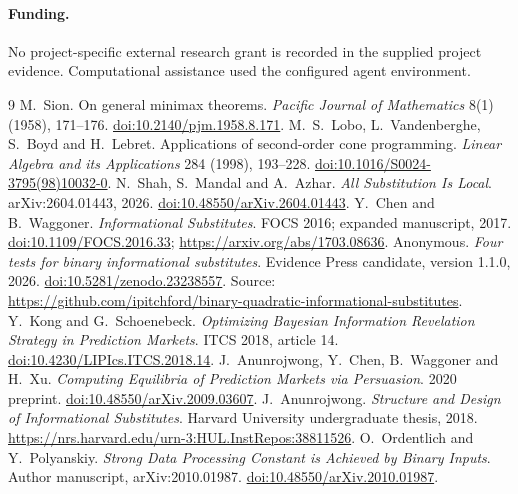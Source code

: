 \documentclass[11pt,a4paper]{article}
\begin{document}
\paragraph{Funding.} No project-specific external research grant is recorded in the supplied project evidence. Computational assistance used the configured agent environment.

\begingroup\small
\begin{thebibliography}{9}
 M.~Sion. On general minimax theorems. \emph{Pacific Journal of Mathematics} 8(1) (1958), 171--176. \href{https://doi.org/10.2140/pjm.1958.8.171}{doi:10.2140/pjm.1958.8.171}.
 M.~S.~Lobo, L.~Vandenberghe, S.~Boyd and H.~Lebret. Applications of second-order cone programming. \emph{Linear Algebra and its Applications} 284 (1998), 193--228. \href{https://doi.org/10.1016/S0024-3795(98)10032-0}{doi:10.1016/S0024-3795(98)10032-0}.
 N.~Shah, S.~Mandal and A.~Azhar. \emph{All Substitution Is Local}. arXiv:2604.01443, 2026. \href{https://doi.org/10.48550/arXiv.2604.01443}{doi:10.48550/arXiv.2604.01443}.
 Y.~Chen and B.~Waggoner. \emph{Informational Substitutes}. FOCS 2016; expanded manuscript, 2017. \href{https://doi.org/10.1109/FOCS.2016.33}{doi:10.1109/FOCS.2016.33}; \url{https://arxiv.org/abs/1703.08636}.
 Anonymous. \emph{Four tests for binary informational substitutes}. Evidence Press candidate, version 1.1.0, 2026. \href{https://doi.org/10.5281/zenodo.23238557}{doi:10.5281/zenodo.23238557}. Source: \url{https://github.com/ipitchford/binary-quadratic-informational-substitutes}.
 Y.~Kong and G.~Schoenebeck. \emph{Optimizing Bayesian Information Revelation Strategy in Prediction Markets}. ITCS 2018, article 14. \href{https://doi.org/10.4230/LIPIcs.ITCS.2018.14}{doi:10.4230/LIPIcs.ITCS.2018.14}.
 J.~Anunrojwong, Y.~Chen, B.~Waggoner and H.~Xu. \emph{Computing Equilibria of Prediction Markets via Persuasion}. 2020 preprint. \href{https://doi.org/10.48550/arXiv.2009.03607}{doi:10.48550/arXiv.2009.03607}.
 J.~Anunrojwong. \emph{Structure and Design of Informational Substitutes}. Harvard University undergraduate thesis, 2018. \url{https://nrs.harvard.edu/urn-3:HUL.InstRepos:38811526}.
 O.~Ordentlich and Y.~Polyanskiy. \emph{Strong Data Processing Constant is Achieved by Binary Inputs}. Author manuscript, arXiv:2010.01987. \href{https://doi.org/10.48550/arXiv.2010.01987}{doi:10.48550/arXiv.2010.01987}.
\end{thebibliography}
\endgroup
\end{document}
